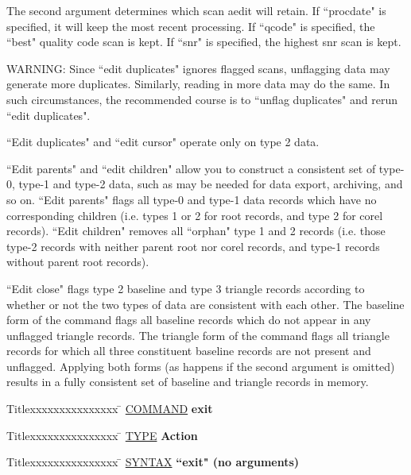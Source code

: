 \begin{list}{}{\setlength{\leftmargin}{0.5in}
     \setlength{\rightmargin}{0in}}
The second argument determines which scan aedit will retain.  If
``procdate" is specified, it will keep the most recent processing.
If ``qcode" is specified, the ``best" quality code scan is kept. If
``snr" is specified, the highest snr scan is kept.
\item
WARNING: Since ``edit duplicates" ignores flagged scans, unflagging
data may generate more duplicates.  Similarly, reading in more
data may do the same.  In such circumstances, the recommended
course is to ``unflag duplicates" and rerun ``edit duplicates".
\item
``Edit duplicates" and ``edit cursor" operate only on type 2 data.
\item
``Edit parents" and ``edit children" allow you to construct a consistent
set of type-0, type-1 and type-2 data, such as may be needed for data
export, archiving, and so on.  ``Edit parents" flags all type-0 and
type-1 data records which have no corresponding children (i.e. types
1 or 2 for root records, and type 2 for corel records).  ``Edit children"
removes all ``orphan" type 1 and 2 records (i.e. those type-2 records
with neither parent root nor corel records, and type-1 records without
parent root records).
\item
``Edit close" flags type 2 baseline and type 3 triangle records according
to whether or not the two types of data are consistent with each other.
The baseline form of the command flags all baseline records which do
not appear in any unflagged triangle records.  The triangle form of the
command flags all triangle records for which all three constituent
baseline records are not present and unflagged.  Applying both forms
(as happens if the second argument is omitted) results in a fully
consistent set of baseline and triangle records in memory.
\end{list}
\vspace{.2in}

\begin{tabbing}
Titlexxxxxxxxxxxxxxx \= \kill
\underline{COMMAND} \> {\bf 	exit} \\
\end{tabbing}

\begin{tabbing}
Titlexxxxxxxxxxxxxxx \= \kill
\underline{TYPE} \> {\bf 		Action} \\
\end{tabbing}

\begin{tabbing}
Titlexxxxxxxxxxxxxxx \= \kill
\underline{SYNTAX} \> {\bf 		``exit" (no arguments)} \\
\end{tabbing}

